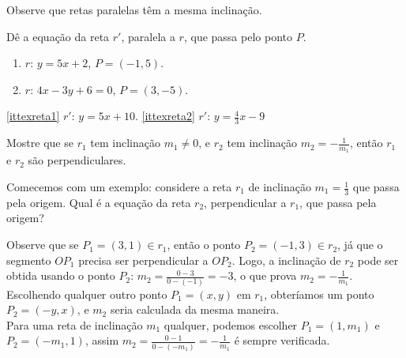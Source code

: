 Observe que retas paralelas têm a mesma inclinação.

\begin{exo}
Dê a equação da reta $r'$, paralela a $r$, que passa pelo ponto $P$.
\begin{multicols}{2}
 \begin{enumerate}
  \item\label{ittexreta1} $r:\,y=5x+2$, $P=(-1,5)$.
\item\label{ittexreta2} $r:\,4x-3y+6=0$, $P=(3,-5)$.
 \end{enumerate}
\end{multicols}
\vspace{0.01cm}
\begin{sol}
\eqref{ittexreta1} $r':\,y=5x+10$.
\eqref{ittexreta2} $r':\,y=\tfrac{4}{3}x-9$
\end{sol}
\end{exo}

\begin{exo}
Mostre que se $r_1$ tem inclinação $m_1\neq 0$, e $r_2$ tem inclinação
$m_2=-\frac{1}{m_1}$, então $r_1$ e $r_2$ são perpendiculares.
 \begin{sol} Comecemos com um exemplo: considere a reta $r_1$ de inclinação $m_1=\tfrac13$
que passa pela origem. Qual é a equação da reta $r_2$, perpendicular a $r_1$, que passa
pela origem?
\begin{center}
 \begin{bmlimage}\end{bmlimage}
\end{center}
 Observe que se $P_1=(3,1)\in r_1$, então o ponto $P_2=(-1,3)\in r_2$, já que o segmento
$OP_1$ precisa ser perpendicular a $OP_2$. Logo, a inclinação de $r_2$ pode ser obtida
usando o ponto $P_2$:
$m_2=\frac{0-3}{0-(-1)}=-3$,
 o que prova $m_2=-\frac{1}{m_1}$. Escolhendo qualquer outro ponto $P_1=(x,y)$ em $r_1$,
obteríamos um ponto $P_2=(-y,x)$, e $m_2$ seria calculada da mesma maneira.\\

 Para uma reta de inclinação $m_1$ qualquer, podemos escolher $P_1=(1,m_1)$ e
$P_2=(-m_1,1)$, assim $m_2=\frac{0-1}{0-(-m_1)}=-\frac{1}{m_1}$ é sempre verificada.
\end{sol}
\end{exo}

